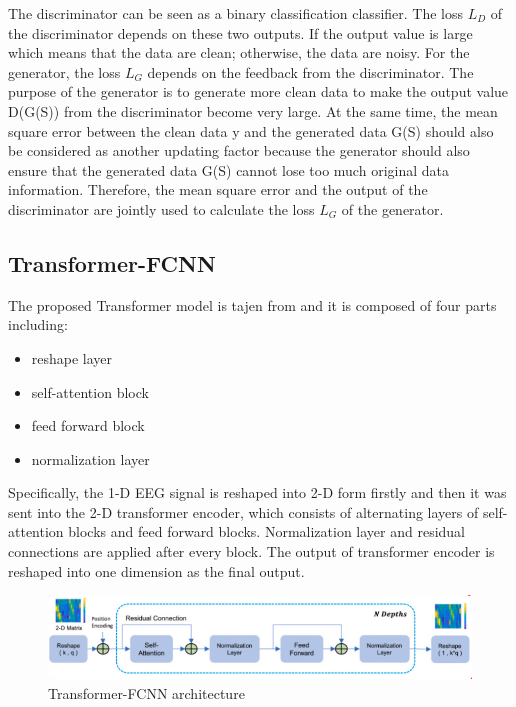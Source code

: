 \documentclass[a4paper]{sapthesis}
\begin{document}
The discriminator can be seen as a binary classification classifier.
 The loss $L_D$
 of the discriminator depends on these two outputs. If the output 
 value is large which means that the data are clean; otherwise, the data 
 are noisy.\newline
 For the generator, the loss $L_G$
 depends on the feedback from the discriminator. The purpose of the generator
  is to generate more clean data to make the output value D(G(S))
 from the discriminator become very large. At the same time, the mean 
 square error between the clean data y and the generated data G(S)
 should also be considered as another updating factor because the generator should also ensure that the generated data G(S)
 cannot lose too much original data information. Therefore, the mean 
 square error and the output of the discriminator are jointly used to 
 calculate the loss $L_G$ of the generator.
\subsection{Transformer-FCNN}\label{sec:model_transformer_fcnn}
The proposed Transformer model is tajen from\cite{EEGdenoiseNet} and it is
composed of four parts including:
\begin{itemize}
\item reshape layer
\item self-attention block
\item feed forward block
\item normalization layer
\end{itemize}
 Specifically, the 1-D EEG signal is reshaped into 2-D form firstly and then 
 it was sent into the 2-D transformer encoder, which consists of 
 alternating layers of self-attention blocks and feed forward blocks. 
 Normalization layer and residual connections are applied after every block.
  The output of transformer encoder is reshaped into one dimension as the
   final output. 
\begin{figure}[h!]
\centering
\includegraphics[width=0.8\linewidth]{images/model_architecture_transformer_fully_connected.PNG}
\caption{Transformer-FCNN architecture}
\end{figure}
\end{document}
